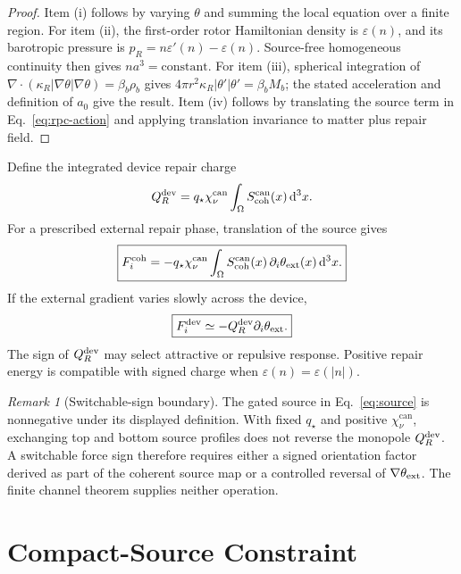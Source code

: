\documentclass[11pt]{article}
\numberwithin{equation}{section}
\theoremstyle{remark}
\newtheorem{remark}[theorem]{Remark}
\newcommand{\chican}{\chi_\nu^{\mathrm{can}}}
\newcommand{\scohcan}{S_{\mathrm{coh}}^{\mathrm{can}}}
\newcommand{\dd}{\,\mathrm d}
\begin{document}
\begin{proof}
Item (i) follows by varying \(\theta\) and summing the local equation over a
finite region. For item (ii), the first-order rotor Hamiltonian density is
\(\varepsilon(n)\), and its barotropic pressure is
\(p_R=n\varepsilon'(n)-\varepsilon(n)\). Source-free homogeneous continuity
then gives \(n a^3=\mathrm{constant}\). For item (iii), spherical integration
of
\(\nabla\cdot(\kappa_R|\nabla\theta|\nabla\theta)=\beta_b\rho_b\)
gives
\(4\pi r^2\kappa_R|\theta'|\theta'=\beta_bM_b\); the stated acceleration and
definition of \(a_0\) give the result. Item (iv) follows by translating the
source term in Eq.~\eqref{eq:rpc-action} and applying translation invariance
to matter plus repair field.
\end{proof}

Define the integrated device repair charge
\begin{equation}
Q_R^{\rm dev}=q_\star\chican
\int_\Omega\scohcan(x)\dd^3x.
\label{eq:device-charge}
\end{equation}
For a prescribed external repair phase, translation of the source gives
\begin{equation}
\boxed{
F_i^{\rm coh}=-q_\star\chican
\int_\Omega\scohcan(x)\,
\partial_i\theta_{\rm ext}(x)\dd^3x.}
\label{eq:force}
\end{equation}
If the external gradient varies slowly across the device,
\begin{equation}
\boxed{F_i^{\rm dev}\simeq
-Q_R^{\rm dev}\partial_i\theta_{\rm ext}.}
\label{eq:slow-force}
\end{equation}
The sign of \(Q_R^{\rm dev}\) may select attractive or repulsive response.
Positive repair energy is compatible with signed charge when
\(\varepsilon(n)=\varepsilon(|n|)\).

\begin{remark}[Switchable-sign boundary]
\label{rem:switchable-sign}
The gated source in Eq.~\eqref{eq:source} is nonnegative under its displayed
definition. With fixed \(q_\star\) and positive \(\chican\), exchanging top and
bottom source profiles does not reverse the monopole
\(Q_R^{\rm dev}\). A switchable force sign therefore requires either a signed
orientation factor derived as part of the coherent source map or a controlled
reversal of \(\nabla\theta_{\rm ext}\). The finite channel theorem supplies
neither operation.
\end{remark}

\section{Compact-Source Constraint}
\end{document}
